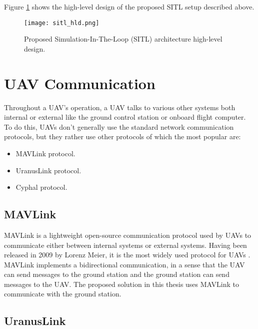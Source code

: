 Figure \ref{fig:sitl-hld} shows the high-level design of the proposed SITL setup described above.

\begin{figure}[H]
    \centering \texttt{[image: sitl\_hld.png]}
    \caption{Proposed Simulation-In-The-Loop (SITL) architecture high-level design.}
    \label{fig:sitl-hld}
\end{figure}




\section{UAV Communication}
\label{sec:uav-communication}

Throughout a UAV's operation, a UAV talks to various other systems both internal or external like the ground control station or onboard flight computer. To do this, UAVs don't generally use the standard network communication protocols, but they rather use other protocols of which the most popular are:

\begin{itemize}
    \item MAVLink protocol.
    \item UranusLink protocol.
    \item Cyphal protocol.
\end{itemize}

\subsection{MAVLink}
\label{subsec:mavlink}

MAVLink is a lightweight open-source communication protocol used by UAVs to communicate either between internal systems or external systems. Having been released in 2009 by Lorenz Meier, it is the most widely used protocol for UAVs \cite{mavlinkdocumentation}. MAVLink implements a bidirectional communication, in a sense that the UAV can send messages to the ground station and the ground station can send messages to the UAV. The proposed solution in this thesis uses MAVLink to communicate with the ground station.

\subsection{UranusLink}
\label{subsec:uranuslink}

